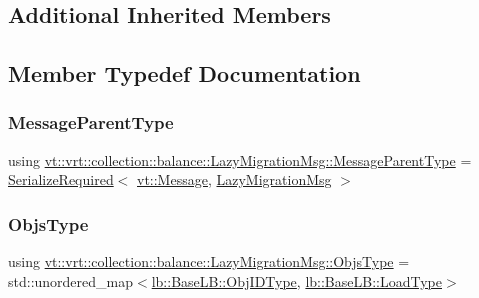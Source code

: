 \subsection*{Additional Inherited Members}


\subsection{Member Typedef Documentation}
\mbox{\label{structvt_1_1vrt_1_1collection_1_1balance_1_1_lazy_migration_msg_ae85922f15b423b53083cccda06ef0b45}} 
\subsubsection{\texorpdfstring{Message\+Parent\+Type}{MessageParentType}}
{\footnotesize\ttfamily using \hyperlink{structvt_1_1vrt_1_1collection_1_1balance_1_1_lazy_migration_msg_ae85922f15b423b53083cccda06ef0b45}{vt\+::vrt\+::collection\+::balance\+::\+Lazy\+Migration\+Msg\+::\+Message\+Parent\+Type} =  \hyperlink{namespacevt_a9e60e2e8929828639383ac1d6643384d}{Serialize\+Required}$<$ \hyperlink{namespacevt_a3a3ddfef40b4c90915fa43cdd5f129ea}{vt\+::\+Message}, \hyperlink{structvt_1_1vrt_1_1collection_1_1balance_1_1_lazy_migration_msg}{Lazy\+Migration\+Msg} $>$}

\mbox{\label{structvt_1_1vrt_1_1collection_1_1balance_1_1_lazy_migration_msg_a8d71e0015ee1e05da54701cae56ef31c}} 
\subsubsection{\texorpdfstring{Objs\+Type}{ObjsType}}
{\footnotesize\ttfamily using \hyperlink{structvt_1_1vrt_1_1collection_1_1balance_1_1_lazy_migration_msg_a8d71e0015ee1e05da54701cae56ef31c}{vt\+::vrt\+::collection\+::balance\+::\+Lazy\+Migration\+Msg\+::\+Objs\+Type} =  std\+::unordered\+\_\+map$<$\hyperlink{structvt_1_1vrt_1_1collection_1_1lb_1_1_base_l_b_a790b22acf448880599724749cdc4e9b3}{lb\+::\+Base\+L\+B\+::\+Obj\+I\+D\+Type}, \hyperlink{structvt_1_1vrt_1_1collection_1_1lb_1_1_base_l_b_a215e22b9f12678303f49615ae3be05cc}{lb\+::\+Base\+L\+B\+::\+Load\+Type}$>$}



